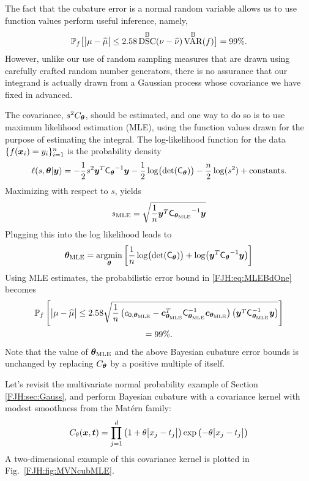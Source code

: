 \documentclass[graybox,footinfo]{svmult}
\DeclareMathOperator{\disc}{DSC}
\DeclareMathOperator{\Var}{VAR}
\begin{document}
The fact that the cubature error is a normal random variable allows us to use function 
values perform useful inference, namely, 
\begin{equation} \label{FJH:eq:MLEBdOne}
\Prob_f\bigl[\abs{\mu - \hmu} \le 2.58 
\disc^{\Ba}(\nu - \hnu) \Var^{\Ba}(f)\bigr] = 99\%.
\end{equation}
However, unlike our use of random sampling measures that are drawn using carefully 
crafted random number generators, there is no assurance that our integrand is actually 
drawn from a Gaussian process whose covariance we have fixed in advanced.  

The covariance, $s^2 C_{{\boldsymbol{\theta}}}$, should be estimated, and one way to do so is to use 
maximum likelihood estimation (MLE), using the function values drawn for the purpose of 
estimating the integral.  The log-likelihood function for the data $ \{f({\boldsymbol{x}}_i )= 
y_i\}_{i=1}^n$ is the probability density
\begin{equation*}
\ell(s,{\boldsymbol{\theta}} | {\boldsymbol{y}}) = - \frac 12 s^2 {\boldsymbol{y}}^T \mathsf{C_{{\boldsymbol{\theta}}}}^{-1} {\boldsymbol{y}} -\frac 12  
\log \bigl(
\det(\mathsf{C_{{\boldsymbol{\theta}}}}) \bigr) - \frac n2 \log(s^2) + \text{constants}.
\end{equation*}
Maximizing with respect to $s$, yields 
\[
s_{\text{MLE}} =  \sqrt{\frac 1n {\boldsymbol{y}}^T \mathsf{C_{{\boldsymbol{\theta}}_{\text{MLE}}}}^{-1} {\boldsymbol{y}}}
\]
Plugging this into the log likelihood leads to 
\[
{\boldsymbol{\theta}}_{\text{MLE}} =  \operatorname*{argmin}_{\boldsymbol{\theta}} \left[\frac 1n \log \bigl(\det(\mathsf{C_{{\boldsymbol{\theta}}}}) 
\bigr) 
+ \log\bigl({\boldsymbol{y}}^T \mathsf{C_{{\boldsymbol{\theta}}}}^{-1} {\boldsymbol{y}} \bigr)  \right ]
\]
Using MLE estimates, the probabilistic error 
bound in \eqref{FJH:eq:MLEBdOne} becomes
\begin{multline} \label{FJH:eq:MLEBdTwo}
\Prob_f\left[\abs{\mu - \hmu} \le 2.58 
\sqrt{\frac 1n \left(c_{0,\bstheta_\MLE} - \bsc_{\bstheta_\MLE} ^T 
	\mC_{\bstheta_\MLE}^{-1} \bsc_{\bstheta_\MLE} \right)  \left(\bsy^T 
	\mathsf{C}_{\bstheta_\MLE}^{-1} \bsy\right)}\right] \\
 = 
99\%.
\end{multline}
Note that the value of ${\boldsymbol{\theta}}_{\text{MLE}}$ and the above Bayesian cubature error bounds  
is unchanged by replacing  $C_{\boldsymbol{\theta}}$ by a positive multiple of itself.  

Let's revisit the multivariate normal probability example of Section \ref{FJH:sec:Gauss}, 
and perform Bayesian cubature with a covariance kernel with modest smoothness from 
the Mat\'ern  family:
\begin{equation} \label{FJH:eq:Matern}
C_\theta(\bsx,\bst) = \prod_{j=1}^d \left(1 + 
\theta\abs{x_j-t_j}\right) \exp\left(-\theta\abs{x_j-t_j}\right)
\end{equation}
A two-dimensional example of this covariance kernel is plotted in Fig.\ 
\ref{FJH:fig:MVNcubMLE}.
\end{document}
